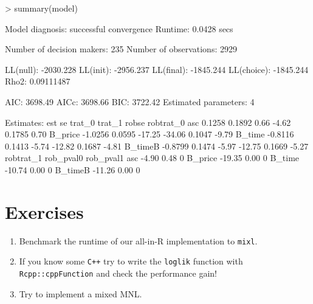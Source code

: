 \documentclass[a4paper]{article}
\begin{document}
\begin{Schunk}
\begin{Sinput}
> summary(model)
\end{Sinput}
\begin{Soutput}
Model diagnosis: successful convergence  
Runtime: 0.0428 secs

Number of decision makers: 235 
Number of observations: 2929 

LL(null):  -2030.228 
LL(init):  -2956.237 
LL(final):  -1845.244 
LL(choice):  -1845.244 
Rho2:  0.09111487 

AIC:  3698.49 
AICc:  3698.66 
BIC:  3722.42 
Estimated parameters:  4 

Estimates:
            est     se trat_0 trat_1  robse robtrat_0
asc      0.1258 0.1892   0.66  -4.62 0.1785      0.70
B_price -1.0256 0.0595 -17.25 -34.06 0.1047     -9.79
B_time  -0.8116 0.1413  -5.74 -12.82 0.1687     -4.81
B_timeB -0.8799 0.1474  -5.97 -12.75 0.1669     -5.27
        robtrat_1 rob_pval0 rob_pval1
asc         -4.90      0.48         0
B_price    -19.35      0.00         0
B_time     -10.74      0.00         0
B_timeB    -11.26      0.00         0
\end{Soutput}
\end{Schunk}


\section{Exercises}

\begin{enumerate}
  \item Benchmark the runtime of our all-in-R implementation to \texttt{mixl}.
  \item If you know some \texttt{C++} try to write the \texttt{loglik} function with \texttt{Rcpp::cppFunction} and check the performance gain!
  \item Try to implement a mixed MNL.
\end{enumerate}
\end{document}
